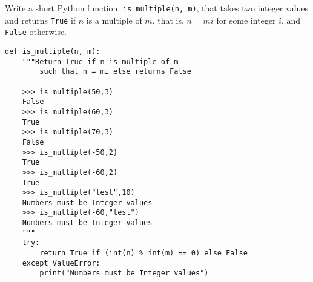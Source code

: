  \label{sssec:ex1_1}

Write a short Python function, \texttt{is\_multiple(n, m)}, that takes two integer values and returns \texttt{True} if $n$ is a multiple of $m$, that is, $n = mi$ for some integer $i$, and \texttt{False} otherwise.

\begin{lstlisting}[title=Exercise R-1.1]
def is_multiple(n, m):
    """Return True if n is multiple of m 
		such that n = mi else returns False

    >>> is_multiple(50,3)
    False
    >>> is_multiple(60,3)
    True
    >>> is_multiple(70,3)
    False
    >>> is_multiple(-50,2)
    True
    >>> is_multiple(-60,2)
    True
    >>> is_multiple("test",10)
    Numbers must be Integer values
    >>> is_multiple(-60,"test")
    Numbers must be Integer values
    """
    try:
        return True if (int(n) % int(m) == 0) else False
    except ValueError:
        print("Numbers must be Integer values")
\end{lstlisting}